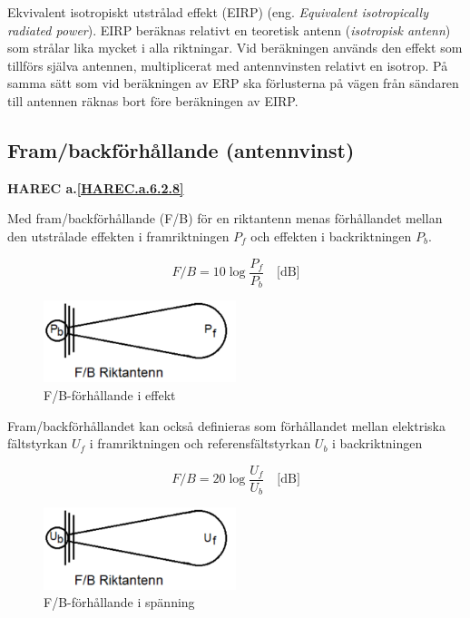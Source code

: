 Ekvivalent isotropiskt utstrålad effekt (EIRP)
(eng. \emph{Equivalent isotropically radiated power}).
EIRP beräknas relativt en teoretisk antenn (\emph{isotropisk antenn}) som
strålar lika mycket i alla riktningar.
Vid beräkningen används den effekt som tillförs själva antennen, multiplicerat
med antennvinsten relativt en isotrop.
På samma sätt som vid beräkningen av ERP ska förlusterna på vägen från sändaren
till antennen räknas bort före beräkningen av EIRP.

\subsection{Fram/backförhållande (antennvinst)}
\textbf{
HAREC a.\ref{HAREC.a.6.2.8}\label{myHAREC.a.6.2.8}
}

Med fram/backförhållande (F/B) för en riktantenn menas förhållandet mellan den
utstrålade effekten i framriktningen \(P_f\) och effekten i backriktningen
\(P_b\).

\[ F/B = 10 \log\frac{P_f}{P_b} \quad \text{[dB]} \]

\begin{figure}
  \includegraphics[width=0.5\textwidth]{images/cropped_pdfs/bild_2_6-08.pdf}
  \caption{F/B-förhållande i effekt}
  \label{fig:bildII6-8}
\end{figure}

Fram/backförhållandet kan också definieras som förhållandet mellan elektriska
fältstyrkan \(U_f\) i framriktningen och referensfältstyrkan \(U_b\) i
backriktningen

\[ F/B = 20 \log\frac{U_f}{U_b} \quad \text{[dB]} \]

\begin{figure}
  \includegraphics[width=0.5\textwidth]{images/cropped_pdfs/bild_2_6-09.pdf}
  \caption{F/B-förhållande i spänning}
  \label{fig:bildII6-9}
\end{figure}

